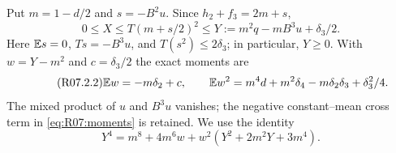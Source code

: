 Put $m=1-d/2$ and $s=-B^2u$. Since $h_2+f_3=2m+s$,
\begin{equation}\tag{R07.2.1}\label{eq:R07:Y}
 0\le X\le T(m+s/2)^2\le Y:=m^2q-mB^3u+\delta_3/2.
\end{equation}
Here $\mathbb E s=0$, $Ts=-B^3u$, and $T(s^2)\le2\delta_3$; in particular,
$Y\ge0$. With $w=Y-m^2$ and $c=\delta_3/2$ the exact moments are
\begin{equation}\tag{R07.2.2}\label{eq:R07:moments}
 \mathbb E w=-m\delta_2+c,\qquad
 \mathbb E w^2=m^4d+m^2\delta_4-m\delta_2\delta_3+\delta_3^2/4.
\end{equation}
The mixed product of $u$ and $B^3u$ vanishes; the negative constant--mean
cross term in \eqref{eq:R07:moments} is retained. We use the identity
\begin{equation}\tag{R07.2.3}\label{eq:R07:fourth}
 Y^4=m^8+4m^6w+w^2(Y^2+2m^2Y+3m^4).
\end{equation}

